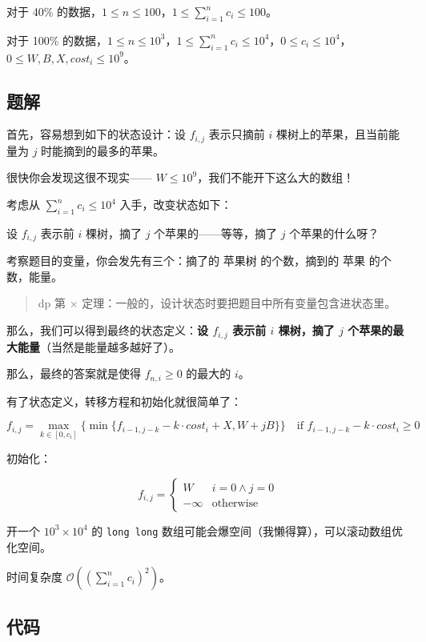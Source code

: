 \documentclass{article}
\begin{document}
	对于 40\% 的数据，$1\le n\le 100$，$\displaystyle 1\le \sum_{i=1}^{n} c_{i} \le 100$。
	
	对于 100\% 的数据，$1\le n\le 10^{3}$，$\displaystyle 1\le \sum_{i=1}^n c_{i} \le 10^{4}$，$0\le c_{i}\le 10^{4}$，$0\le W,B,X,cost_{i}\le 10^{9}$。

	\subsection{题解}

	首先，容易想到如下的状态设计：设 $f_{i,j}$ 表示只摘前 $i$ 棵树上的苹果，且当前能量为 $j$ 时能摘到的最多的苹果。

	很快你会发现这很不现实—— $W\le 10^9$，我们不能开下这么大的数组！

	考虑从 $\displaystyle\sum_{i=1}^n c_i\le 10^4$ 入手，改变状态如下：

	设 $f_{i,j}$ 表示前 $i$ 棵树，摘了 $j$ 个苹果的——等等，摘了 $j$ 个苹果的什么呀？

	考察题目的变量，你会发先有三个：摘了的 苹果树 的个数，摘到的 苹果 的个数，能量。

	\begin{quote}
		dp 第 $\times$ 定理：一般的，设计状态时要把题目中所有变量包含进状态里。
	\end{quote}

	那么，我们可以得到最终的状态定义：\textbf{设 $f_{i,j}$ 表示前 $i$ 棵树，摘了 $j$ 个苹果的最大能量}（当然是能量越多越好了）。

	那么，最终的答案就是使得 $f_{n,i}\ge 0$ 的最大的 $i$。

	有了状态定义，转移方程和初始化就很简单了：

	\[
		f_{i,j}=\max_{k\in[0,c_i]}\{\min\{f_{i-1,j-k}-k\cdot cost_i+X,W+jB\}\}\quad\text{if }f_{i-1,j-k}-k\cdot cost_i \ge 0
	\]

	初始化：

	\[
		f_{i,j}=\begin{cases}W&i=0\land j=0\\-\infty&\text{otherwise}\end{cases}
	\]

	开一个 $10^3\times 10^4$ 的 \texttt{long long} 数组可能会爆空间（我懒得算），可以滚动数组优化空间。

	时间复杂度 $\displaystyle\mathcal O\left(\left(\sum_{i=1}^n c_{i}\right)^2\right)$。

	\subsection{代码}
\end{document}
